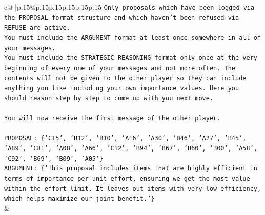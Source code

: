\documentclass{article}
\begin{document}
{\begin{supertabular}{c@{$\;$}|p{.15\linewidth}@{}p{.15\linewidth}p{.15\linewidth}p{.15\linewidth}p{.15\linewidth}p{.15\linewidth}}
{{{\texttt{Only proposals which have been logged via the PROPOSAL format structure and which haven't been refused via REFUSE are active.} \\
\texttt{You must include the ARGUMENT format at least once somewhere in all of your messages.} \\
\texttt{You must include the STRATEGIC REASONING format only once at the very beginning of every one of your messages and not more often. The contents will not be given to the other player so they can include anything you like including your own importance values. Here you should reason step by step to come up with you next move.} \\
\\ 
\texttt{You will now receive the first message of the other player.} \\
\\ 
\texttt{PROPOSAL: \{'C15', 'B12', 'B10', 'A16', 'A30', 'B46', 'A27', 'B45', 'A89', 'C81', 'A08', 'A66', 'C12', 'B94', 'B67', 'B60', 'B00', 'A58', 'C92', 'B69', 'B09', 'A05'\}} \\
\texttt{ARGUMENT: \{'This proposal includes items that are highly efficient in terms of importance per unit effort, ensuring we get the most value within the effort limit. It leaves out items with very low efficiency, which helps maximize our joint benefit.'\}} \\
            }
        }
    }
    & \\ \\


\end{supertabular}}
\end{document}

